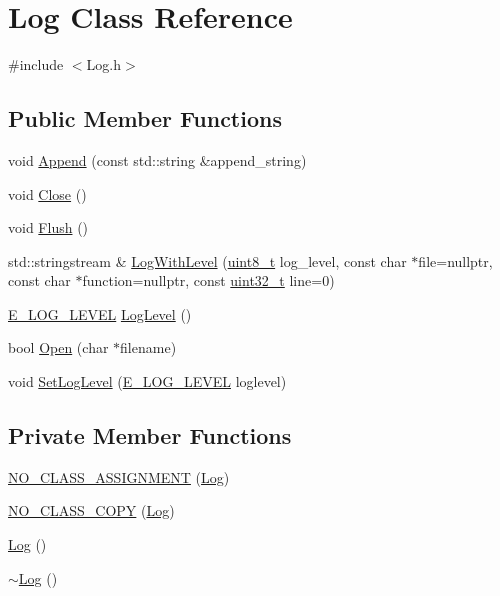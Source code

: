 \section{Log Class Reference}
\label{class_log}


{\ttfamily \#include $<$Log.\-h$>$}

\subsection*{Public Member Functions}
\begin{DoxyCompactItemize}
\item 
void \hyperlink{class_log_a7322cffafaf49b852e50f49e5d5fd56d}{Append} (const std\-::string \&append\-\_\-string)
\item 
void \hyperlink{class_log_ad836545209976c5bf2e028f7036c68a6}{Close} ()
\item 
void \hyperlink{class_log_afb04394b40af57b572c2f2a0eb3aa47b}{Flush} ()
\item 
std\-::stringstream \& \hyperlink{class_log_a2d39e1371315e0db314073c61a6d5194}{Log\-With\-Level} (\hyperlink{stdint_8h_aba7bc1797add20fe3efdf37ced1182c5}{uint8\-\_\-t} log\-\_\-level, const char $\ast$file=nullptr, const char $\ast$function=nullptr, const \hyperlink{stdint_8h_a435d1572bf3f880d55459d9805097f62}{uint32\-\_\-t} line=0)
\item 
\hyperlink{_log_8h_a1ffd9698eb630ed3e706a67e39aea25d}{E\-\_\-\-L\-O\-G\-\_\-\-L\-E\-V\-E\-L} \hyperlink{class_log_ac208727583b061465ada85f2eae3b975}{Log\-Level} ()
\item 
bool \hyperlink{class_log_a4b1b095c3ca027c4e6f28226b5347399}{Open} (char $\ast$filename)
\item 
void \hyperlink{class_log_a746b725c837b9061aa17b2aeebeace20}{Set\-Log\-Level} (\hyperlink{_log_8h_a1ffd9698eb630ed3e706a67e39aea25d}{E\-\_\-\-L\-O\-G\-\_\-\-L\-E\-V\-E\-L} loglevel)
\end{DoxyCompactItemize}
\subsection*{Private Member Functions}
\begin{DoxyCompactItemize}
\item 
\hyperlink{class_log_a7bb0133b6592fd0a5ce501b78ccaa6f8}{N\-O\-\_\-\-C\-L\-A\-S\-S\-\_\-\-A\-S\-S\-I\-G\-N\-M\-E\-N\-T} (\hyperlink{class_log}{Log})
\item 
\hyperlink{class_log_a84cd9f10ec90924af12968fb433856f3}{N\-O\-\_\-\-C\-L\-A\-S\-S\-\_\-\-C\-O\-P\-Y} (\hyperlink{class_log}{Log})
\item 
\hyperlink{class_log_af6071a60aa52b6c1b511f99b4bc1b8fe}{Log} ()
\item 
\hyperlink{class_log_a0fbfda88fbee5027c89f6eb121059360}{$\sim$\-Log} ()
\end{DoxyCompactItemize}
